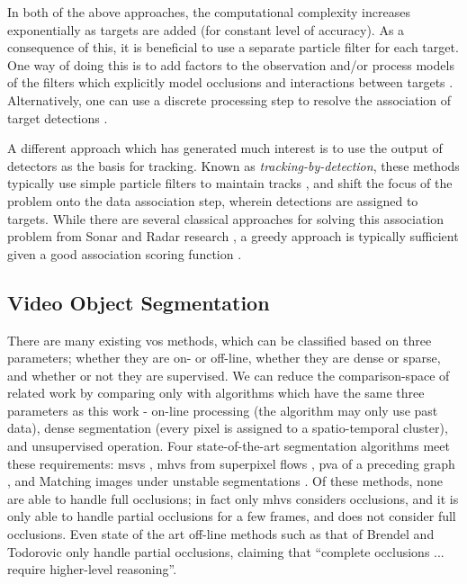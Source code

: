 In both of the above approaches, the computational complexity increases exponentially as targets are added (for constant level of accuracy). As a consequence of this, it is beneficial to use a separate particle filter for each target. One way of doing this is to add factors to the observation and/or process models of the filters which explicitly model occlusions and interactions between targets \cite{MCMCPartFilt_05, ApproxMultiTrack_06}. Alternatively, one can use a discrete processing step to resolve the association of target detections \cite{Koo_IROS2013, Breitenstein_ICCV2009}. 

A different approach which has generated much interest is to use the output of detectors as the basis for tracking. Known as \emph{tracking-by-detection}, these methods typically use simple particle filters to maintain tracks \cite{RobustVTMT_06,MultipersonTBD_011}, and shift the focus of the problem onto the data association step, wherein detections are assigned to targets. While there are several classical approaches for solving this association problem from Sonar and Radar research \cite{SonarMultiTrack_83,MultiTrack_79}, a greedy approach is typically sufficient given a good association scoring function \cite{DetTrackMultiHumans_07,MultipersonTBD_011}. 

\subsection{Video Object Segmentation}
There are many existing \gls{vos} methods, which can be classified based on three parameters; whether they are on- or off-line, whether they are dense or sparse, and whether or not they are supervised. We can reduce the comparison-space of related work by comparing only with algorithms which have the same three parameters as this work - on-line processing (the algorithm may only use past data), dense segmentation (every pixel is assigned to a spatio-temporal cluster), and unsupervised operation. Four state-of-the-art segmentation algorithms meet these requirements: \gls{msvs} \cite{MSVS}, \gls{mhvs} from superpixel flows \cite{MHVS}, \gls{pva} of a preceding graph \cite{PropValAgg}, and Matching images under unstable segmentations \cite{MatchingUnstable}.  Of these methods, none are able to handle full occlusions; in fact only \gls{mhvs} considers occlusions, and it is only able to handle partial occlusions for a few frames, and does not consider full occlusions. Even state of the art off-line methods such as that of Brendel and Todorovic \cite{SegTrackRegions} only handle partial occlusions, claiming that ``complete occlusions ... require higher-level reasoning''.  

